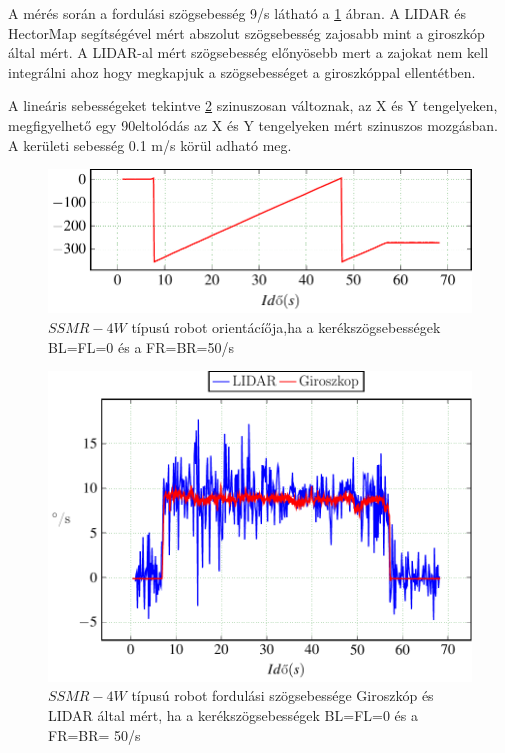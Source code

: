 A mérés során a fordulási szögsebesség 9\degree/s látható a \ref{fig:Left0Right50c} ábran. A LIDAR és HectorMap segítségével mért abszolut szögsebesség zajosabb mint a giroszkóp által mért. A LIDAR-al mért szögsebesség előnyösebb mert a zajokat nem kell integrálni ahoz hogy megkapjuk a szögsebességet a giroszkóppal ellentétben.

A lineáris sebességeket tekintve \ref{fig:Left0Right50d} szinuszosan változnak, az X és Y tengelyeken, megfigyelhető egy 90\degree eltolódás az X és Y tengelyeken mért szinuszos mozgásban. A kerületi sebesség 0.1 m/s körül adható meg.

\begin{figure}[H]
  \includegraphics{tikz/Left0Right50c.pdf}
  \caption{$SSMR-4W$ típusú robot orientácíőja,ha a kerékszögsebességek BL=FL=0 és a FR=BR=50\degree/s}
  \label{fig:Left0Right50c}
\end{figure}


\begin{figure}[H]
  \label{fig:Left0Right50d}
  \includegraphics{tikz/Left0Right50d.pdf}
  \caption{$SSMR-4W$ típusú robot fordulási szögsebessége Giroszkóp és LIDAR által mért, ha a kerékszögsebességek BL=FL=0 és a FR=BR= 50\degree/s}
  \label{fig:Left0Right50d}
\end{figure}



